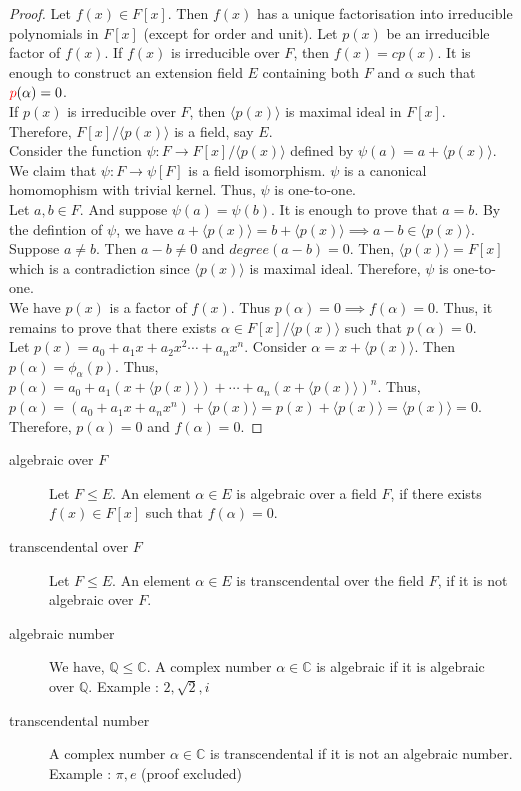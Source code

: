 \begin{proof}
	Let $f(x) \in F[x]$.
	Then $f(x)$ has a unique factorisation into irreducible polynomials in $F[x]$ (except for order and unit).
	Let $p(x)$ be an irreducible factor of $f(x)$.
	If $f(x)$ is irreducible over $F$, then $f(x) = cp(x)$.
	It is enough to construct an extension field $E$ containing both $F$ and $\alpha$ such that ${\color{red}p}(\alpha) = 0$.\\


	If $p(x)$ is irreducible over $F$, then $\langle p(x) \rangle$ is maximal ideal in $F[x]$.
	Therefore, $F[x]/\langle p(x) \rangle$ is a field, say $E$.\\


	Consider the function $\psi : F \to F[x]/\langle p(x) \rangle$ defined by $\psi(a) = a+\langle p(x) \rangle$.
	We claim that $\psi : F \to \psi[F]$ is a field isomorphism.
	$\psi$ is a canonical homomophism with trivial kernel. Thus, $\psi$ is one-to-one.\\


	Let $a,b \in F$.
	And suppose $\psi(a) = \psi(b)$.
	It is enough to prove that $a = b$.
	By the defintion of $\psi$, we have $a+\langle p(x) \rangle = b + \langle p(x) \rangle \implies a-b \in \langle p(x) \rangle$.
	Suppose $a \ne b$.
	Then $a-b \ne 0$ and $degree(a-b) = 0$.
	Then, $\langle p(x) \rangle = F[x]$ which is a contradiction since $\langle p(x) \rangle$ is maximal ideal.
	Therefore, $\psi$ is one-to-one.\\

	
	We have $p(x)$ is a factor of $f(x)$.
	Thus $p(\alpha) = 0 \implies f(\alpha) = 0$.
	Thus, it remains to prove that there exists $\alpha \in F[x]/\langle p(x) \rangle$ such that $p(\alpha) = 0$.\\

	Let $p(x) = a_0 + a_1x + a_2 x^2\cdots + a_n x^n$.
	Consider $\alpha = x + \langle p(x) \rangle$.
	Then $p(\alpha) = \phi_\alpha(p)$.
	Thus, $p(\alpha) = a_0 + a_1(x+\langle p(x) \rangle) + \cdots + a_n(x + \langle p(x) \rangle)^n$.
	Thus, $p(\alpha) = (a_0+a_1x + a_n x^n) + \langle p(x) \rangle = p(x) + \langle p(x) \rangle = \langle p(x) \rangle = 0$.
	Therefore, $p(\alpha) = 0$ and $f(\alpha) = 0$.
\end{proof}

\begin{description}
	\item[algebraic over $F$] Let $F \le E$.
		An element $\alpha \in E$ is algebraic over a field $F$, if there exists $f(x) \in F[x]$ such that $f(\alpha) = 0$.
	\item[transcendental over $F$] Let $F \le E$.
		An element $\alpha \in E$ is transcendental over the field $F$, if it is not algebraic over $F$.
	\item[algebraic number] We have, $\mathbb{Q} \le \mathbb{C}$. A complex number $\alpha \in \mathbb{C}$ is algebraic if  it is algebraic over $\mathbb{Q}$.
		Example : $2,\sqrt{2},i$
	\item[transcendental number] A complex number $\alpha \in \mathbb{C}$ is transcendental if it is not an algebraic number.
		Example : $\pi,e$ (proof excluded)
\end{description}

